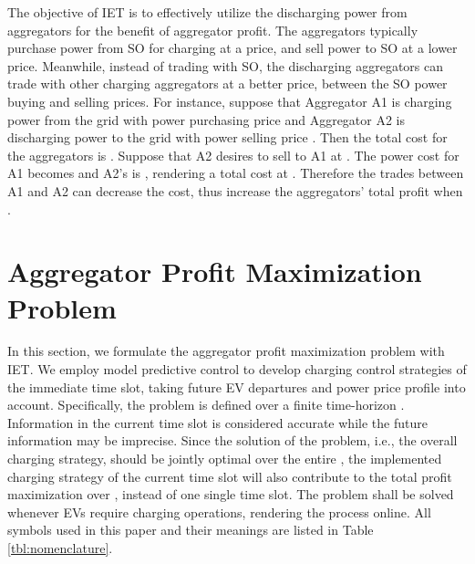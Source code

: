 \documentclass[conference]{IEEEtran}
\begin{document}
The objective of IET is to effectively utilize the discharging power from aggregators for the benefit of aggregator profit.
    The aggregators typically purchase power from SO for charging at a price, and sell power to SO at a lower price. Meanwhile, instead of trading with SO, the discharging aggregators can trade with other charging aggregators at a better price, between the SO power buying and selling prices. For instance, suppose that Aggregator A1 is charging power  from the grid with power purchasing price  and Aggregator A2 is discharging power  to the grid with power selling price .
Then the total cost for the aggregators is .
Suppose that A2 desires to sell  to A1 at . 
The power cost for A1 becomes  and A2's is , rendering a total cost at . 
Therefore the trades between A1 and A2 can decrease the cost, thus increase the aggregators' total profit when .










	\section{Aggregator Profit Maximization Problem}\label{sec:centralized}
	


In this section, we formulate the aggregator profit maximization problem with IET.
We employ model predictive control to develop charging control strategies of the immediate time slot, taking future EV departures and power price profile into account. Specifically, the problem is defined over a finite time-horizon . Information in the current time slot  is considered accurate while the future information may be imprecise. Since the solution of the problem, i.e., the overall charging strategy, should be jointly optimal over the entire , the implemented charging strategy of the current time slot will also contribute to the total profit maximization over , instead of one single time slot. The problem shall be solved whenever EVs require charging operations, rendering the process online. All symbols used in this paper and their meanings are listed in Table \ref{tbl:nomenclature}.
    
\end{document}
